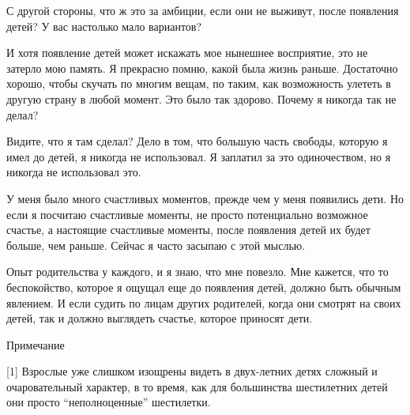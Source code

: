 \documentclass[ebook,12pt,oneside,openany]{memoir}
\begin{document}
С другой стороны, что ж это за амбиции, если они не выживут, после
появления детей? У вас настолько мало вариантов?

И хотя появление детей может искажать мое нынешнее восприятие, это не
затерло мою память. Я прекрасно помню, какой была жизнь раньше.
Достаточно хорошо, чтобы скучать по многим вещам, по таким, как
возможность улететь в другую страну в любой момент. Это было так
здорово. Почему я никогда так не делал?

Видите, что я там сделал? Дело в том, что большую часть свободы,
которую я имел до детей, я никогда не использовал. Я заплатил за это
одиночеством, но я никогда не использовал это.

У меня было много счастливых моментов, прежде чем у меня появились
дети. Но если я посчитаю счастливые моменты, не просто потенциально
возможное счастье, а настоящие счастливые моменты, после появления
детей их будет больше, чем раньше. Сейчас я часто засыпаю с этой
мыслью.

Опыт родительства у каждого, и я знаю, что мне повезло. Мне кажется,
что то беспокойство, которое я ощущал еще до появления детей, должно
быть обычным явлением. И если судить по лицам других родителей, когда
они смотрят на своих детей, так и должно выглядеть счастье, которое
приносят дети.

Примечание

[1] Взрослые уже слишком изощрены видеть в двух-летних детях сложный и
очаровательный характер, в то время, как для большинства шестилетних
детей они просто “неполноценные” шестилетки.
\end{document}
